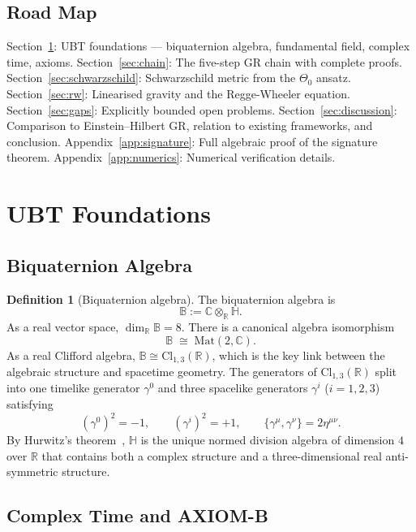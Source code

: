 \documentclass[12pt,a4paper]{article}
\theoremstyle{definition}
\newtheorem{definition}[theorem]{Definition}
\theoremstyle{remark}
\newcommand{\BB}{\mathbb{B}}
\newcommand{\CC}{\mathbb{C}}
\newcommand{\RR}{\mathbb{R}}
\newcommand{\HH}{\mathbb{H}}
\begin{document}
\subsection{Road Map}

Section~\ref{sec:foundations}: UBT foundations — biquaternion algebra,
fundamental field, complex time, axioms.
Section~\ref{sec:chain}: The five-step GR chain with complete proofs.
Section~\ref{sec:schwarzschild}: Schwarzschild metric from the $\Theta_0$ ansatz.
Section~\ref{sec:rw}: Linearised gravity and the Regge-Wheeler equation.
Section~\ref{sec:gaps}: Explicitly bounded open problems.
Section~\ref{sec:discussion}: Comparison to Einstein--Hilbert GR, relation
to existing frameworks, and conclusion.
Appendix~\ref{app:signature}: Full algebraic proof of the signature theorem.
Appendix~\ref{app:numerics}: Numerical verification details.

\section{UBT Foundations}
\label{sec:foundations}

\subsection{Biquaternion Algebra}

\begin{definition}[Biquaternion algebra]
\label{def:biquaternion}
The biquaternion algebra is
\[
  \BB := \CC\otimes_\RR\HH.
\]
As a real vector space, $\dim_\RR\BB = 8$.
There is a canonical algebra isomorphism
\[
  \BB \;\cong\; \mathrm{Mat}(2,\CC).
\]
As a real Clifford algebra,
$\BB \cong \mathrm{Cl}_{1,3}(\RR)$,
which is the key link between the algebraic structure and spacetime geometry.
The generators of $\mathrm{Cl}_{1,3}(\RR)$ split into one timelike generator
$\gamma^0$ and three spacelike generators $\gamma^i$ ($i = 1,2,3$) satisfying
\[
  (\gamma^0)^2 = -1, \qquad
  (\gamma^i)^2 = +1, \qquad
  \{\gamma^\mu, \gamma^\nu\} = 2\eta^{\mu\nu}.
\]
By Hurwitz's theorem~\cite{hurwitz1923}, $\HH$ is the unique normed division
algebra of dimension $4$ over $\RR$ that contains both a complex structure
and a three-dimensional real anti-symmetric structure.
\end{definition}

\subsection{Complex Time and AXIOM-B}
\end{document}
